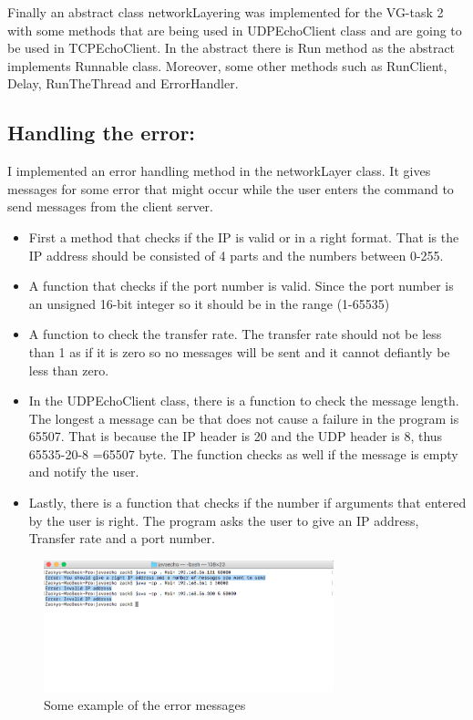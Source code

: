 \documentclass[a4paper,12pt]{article}
\begin{document}
Finally an abstract class networkLayering was implemented for the VG-task 2 with some methods that are being used in UDPEchoClient class and are going to be used in TCPEchoClient. 
In the abstract there is Run method as the abstract implements Runnable class. Moreover, some other methods such as RunClient, Delay, RunTheThread  and ErrorHandler.



\subsection {Handling the error:}
I implemented an error handling method in the networkLayer class. It gives messages for some error that might occur while the user enters the command to send messages from the client server. 
\begin{itemize}
\item	First a method that checks if the IP is valid or in a right format. That is the IP address should be consisted of 4 parts and the numbers between 0-255.
\item A function that checks if the port number is valid. Since the port number is an unsigned 16-bit integer so it should be in the range (1-65535)
\item	A function to check the transfer rate. The transfer rate should not be less than 1 as if it is zero so no messages will be sent and it cannot defiantly be less than zero.
\item	In the UDPEchoClient class, there is a function to check the message length. The longest a message can be that does not cause a failure in the program is 65507. That is because the IP header is 20 and the UDP header is 8, thus 65535-20-8 =65507 byte. The function checks as well if the message is empty and notify the user.
\item	Lastly, there is a function that checks if the number if arguments that entered by the user is right. The program asks the user to give an IP address, Transfer rate and a port number. 

\end{itemize}

\begin{figure}[h]
    \centering
    \includegraphics[width=0.75\textwidth]{figure10}
    \caption{Some example of the error messages}
    \label{}
\end{figure}
\end{document}

